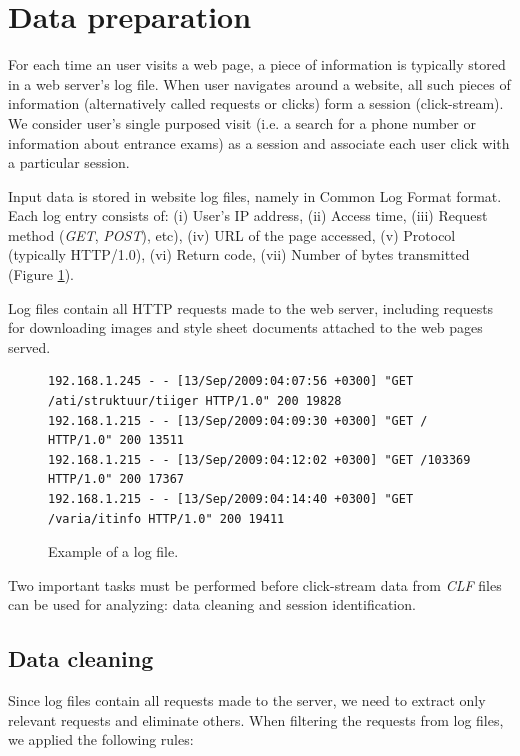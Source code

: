 \documentclass[12pt, english,a4paper]{article}
\begin{document}
\section{Data preparation} 
For each time an user visits a web page, a piece of information is typically stored in a web server's log file. When user navigates around a website, all such pieces of information (alternatively called requests or clicks) form a session (click-stream). We consider user's single purposed visit  (i.e. a search for a phone number or information about entrance exams) as a session and associate each user click with a particular session. 

Input data is stored in website log files, namely in Common Log Format\cite{ref_clf} format. Each log entry consists of:  (i) User's IP address, (ii) Access time, (iii) Request method (\emph{GET}, \emph{POST}), etc), (iv) URL of the page accessed, (v) Protocol (typically HTTP/1.0), (vi) Return code, (vii) Number of bytes transmitted (Figure \ref{log_sample}).

Log files contain all HTTP requests made to the web server, including requests for downloading images and style sheet documents attached to the web pages served.

\begin{figure}[h]
{\tiny
\begin{verbatim}
192.168.1.245 - - [13/Sep/2009:04:07:56 +0300] "GET /ati/struktuur/tiiger HTTP/1.0" 200 19828
192.168.1.215 - - [13/Sep/2009:04:09:30 +0300] "GET / HTTP/1.0" 200 13511
192.168.1.215 - - [13/Sep/2009:04:12:02 +0300] "GET /103369 HTTP/1.0" 200 17367
192.168.1.215 - - [13/Sep/2009:04:14:40 +0300] "GET /varia/itinfo HTTP/1.0" 200 19411
\end{verbatim}
}
\label{log_sample}
\caption{Example of a log file.}
\end{figure}

Two important tasks must be performed before click-stream data from \emph{CLF} files can be used for analyzing: data cleaning and session identification.







\subsection{Data cleaning}
Since log files contain all requests made to the server, we need to extract only relevant requests and eliminate others. When filtering the requests from log files, we applied the following rules:
\end{document}
